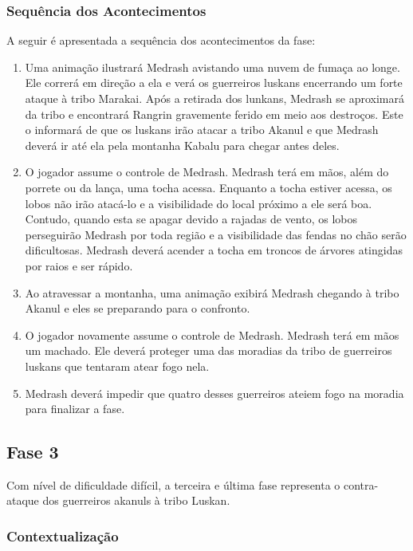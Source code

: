 \subsubsection{Sequência dos Acontecimentos}

A seguir é apresentada a sequência dos acontecimentos da fase:

\begin{enumerate}
\item Uma animação ilustrará Medrash avistando uma nuvem de fumaça ao longe. Ele correrá em direção a ela e verá os guerreiros luskans encerrando um forte ataque à tribo Marakai. Após a retirada dos lunkans, Medrash se aproximará da tribo e encontrará Rangrin gravemente ferido em meio aos destroços. Este o informará de que os luskans irão atacar a tribo Akanul e que Medrash deverá ir até ela pela montanha Kabalu para chegar antes deles.
\item O jogador assume o controle de Medrash. Medrash terá em mãos, além do porrete ou da lança, uma tocha acessa. Enquanto a tocha estiver acessa, os lobos não irão atacá-lo e a visibilidade do local próximo a ele será boa. Contudo, quando esta se apagar devido a rajadas de vento, os lobos perseguirão Medrash por toda região e a visibilidade das fendas no chão serão dificultosas. Medrash deverá acender a tocha em troncos de árvores atingidas por raios e ser rápido.
\item Ao atravessar a montanha, uma animação exibirá Medrash chegando à tribo Akanul e eles se preparando para o confronto.
\item O jogador novamente assume o controle de Medrash. Medrash terá em mãos um machado. Ele deverá proteger uma das moradias da tribo de guerreiros luskans que tentaram atear fogo nela.
\item Medrash deverá impedir que quatro desses guerreiros ateiem fogo na moradia para finalizar a fase.
\end{enumerate}

\subsection{Fase 3}

Com nível de dificuldade difícil, a terceira e última fase representa o contra-ataque dos guerreiros akanuls à tribo Luskan.

\subsubsection{Contextualização}

